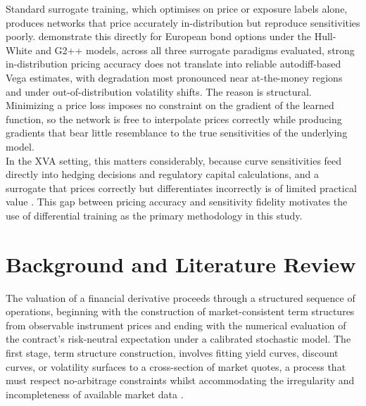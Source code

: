     \noindent
    Standard surrogate training, which optimises on price or exposure labels alone, produces networks that price accurately in-distribution but reproduce sensitivities poorly. \cite{lee2026deeponet} demonstrate this directly for European bond options under the Hull-White and G2++ models, across all three surrogate paradigms evaluated, strong in-distribution pricing accuracy does not translate into reliable autodiff-based Vega estimates, with degradation most pronounced near at-the-money regions and under out-of-distribution volatility shifts. The reason is structural. Minimizing a price loss imposes no constraint on the gradient of the learned function, so the network is free to interpolate prices correctly while producing gradients that bear little resemblance to the true sensitivities of the underlying model. \\

    \noindent
    In the XVA setting, this matters considerably, because curve sensitivities feed directly into hedging decisions and regulatory capital calculations, and a surrogate that prices correctly but differentiates incorrectly is of limited practical value \cite{deelstra2024accelerated}. This gap between pricing accuracy and sensitivity fidelity motivates the use of differential training as the primary methodology in this study. \\



    
\chapter{Background and Literature Review}
    \noindent
    The valuation of a financial derivative proceeds through a structured sequence of operations, beginning with the construction of market-consistent term structures from observable instrument prices and ending with the numerical evaluation of the contract's risk-neutral expectation under a calibrated stochastic model. The first stage, term structure construction, involves fitting yield curves, discount curves, or volatility surfaces to a cross-section of market quotes, a process that must respect no-arbitrage constraints whilst accommodating the irregularity and incompleteness of available market data \cite{nisha2024foundations}. \\


